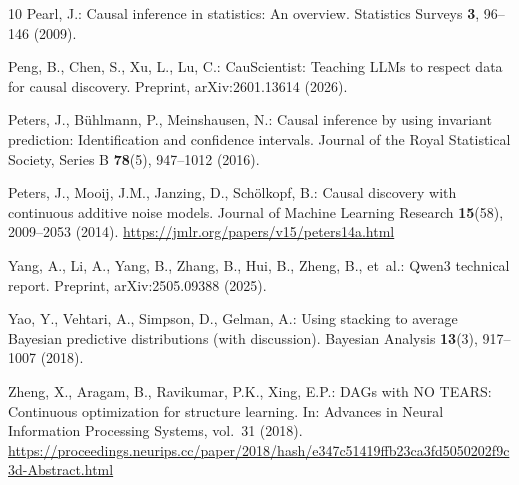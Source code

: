 \documentclass{svproc}
\begin{document}
\begin{thebibliography}{10}
Pearl, J.: Causal inference in statistics: An overview.
\newblock Statistics Surveys \textbf{3}, 96--146 (2009).
\newblock {}

Peng, B., Chen, S., Xu, L., Lu, C.: {CauScientist}: Teaching {LLMs} to respect
  data for causal discovery.
\newblock Preprint, arXiv:2601.13614 (2026).
\newblock {}

Peters, J., B{\"u}hlmann, P., Meinshausen, N.: Causal inference by using
  invariant prediction: Identification and confidence intervals.
\newblock Journal of the Royal Statistical Society, Series B \textbf{78}(5),
  947--1012 (2016).
\newblock {}

Peters, J., Mooij, J.M., Janzing, D., Sch{\"o}lkopf, B.: Causal discovery with
  continuous additive noise models.
\newblock Journal of Machine Learning Research \textbf{15}(58), 2009--2053
  (2014).
\newblock \urlprefix\url{https://jmlr.org/papers/v15/peters14a.html}

Yang, A., Li, A., Yang, B., Zhang, B., Hui, B., Zheng, B., et~al.: {Qwen3}
  technical report.
\newblock Preprint, arXiv:2505.09388 (2025).
\newblock {}

Yao, Y., Vehtari, A., Simpson, D., Gelman, A.: Using stacking to average
  {Bayesian} predictive distributions (with discussion).
\newblock Bayesian Analysis \textbf{13}(3), 917--1007 (2018).
\newblock {}

Zheng, X., Aragam, B., Ravikumar, P.K., Xing, E.P.: {DAGs} with {NO TEARS}:
  Continuous optimization for structure learning.
\newblock In: Advances in Neural Information Processing Systems, vol.~31
  (2018).
\newblock
  \urlprefix\url{https://proceedings.neurips.cc/paper/2018/hash/e347c51419ffb23ca3fd5050202f9c3d-Abstract.html}

\end{thebibliography}
\label{paper-end}
\end{document}
